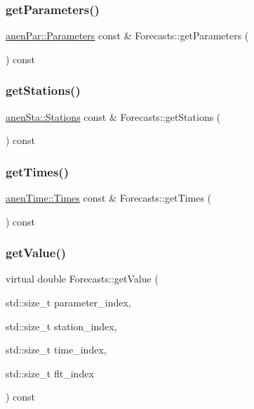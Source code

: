 \subsubsection{\texorpdfstring{get\+Parameters()}{getParameters()}}
{\footnotesize\ttfamily \mbox{\hyperlink{classanen_par_1_1_parameters}{anen\+Par\+::\+Parameters}} const  \& Forecasts\+::get\+Parameters (\begin{DoxyParamCaption}{ }\end{DoxyParamCaption}) const}

\mbox{\label{class_forecasts_a31978316404dedda6ae3860d7844d855}} 
\subsubsection{\texorpdfstring{get\+Stations()}{getStations()}}
{\footnotesize\ttfamily \mbox{\hyperlink{classanen_sta_1_1_stations}{anen\+Sta\+::\+Stations}} const  \& Forecasts\+::get\+Stations (\begin{DoxyParamCaption}{ }\end{DoxyParamCaption}) const}

\mbox{\label{class_forecasts_ac256fce5eb5e6e773f7f8579bf10c7d7}} 
\subsubsection{\texorpdfstring{get\+Times()}{getTimes()}}
{\footnotesize\ttfamily \mbox{\hyperlink{classanen_time_1_1_times}{anen\+Time\+::\+Times}} const  \& Forecasts\+::get\+Times (\begin{DoxyParamCaption}{ }\end{DoxyParamCaption}) const}

\mbox{\label{class_forecasts_a7e6690ba3d8af6ca02d76c6c57701ed4}} 
\subsubsection{\texorpdfstring{get\+Value()}{getValue()}\hspace{0.1cm}{\footnotesize\ttfamily [1/2]}}
{\footnotesize\ttfamily virtual double Forecasts\+::get\+Value (\begin{DoxyParamCaption}\item[{std\+::size\+\_\+t}]{parameter\+\_\+index,  }\item[{std\+::size\+\_\+t}]{station\+\_\+index,  }\item[{std\+::size\+\_\+t}]{time\+\_\+index,  }\item[{std\+::size\+\_\+t}]{flt\+\_\+index }\end{DoxyParamCaption}) const\hspace{0.3cm}{\ttfamily [pure virtual]}}

